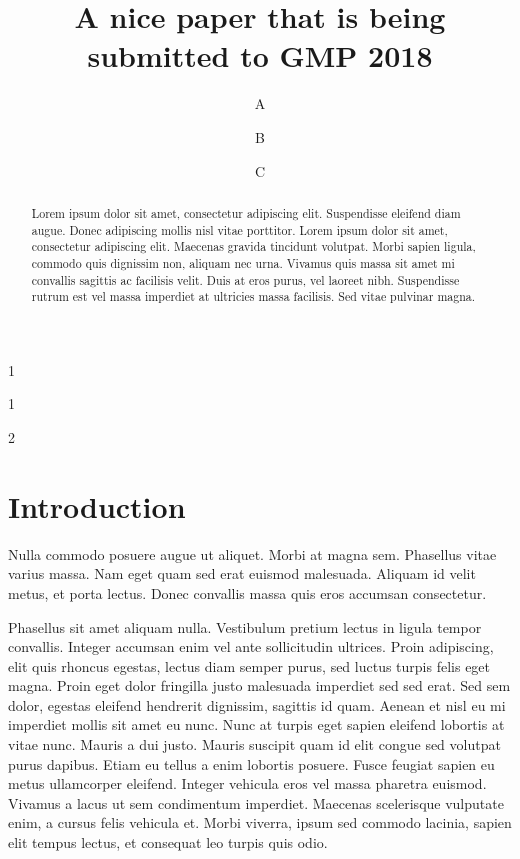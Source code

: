 \documentclass[submission]{gmp2018}
\begin{document}
%
%
\title{A nice paper that is being submitted to GMP 2018}

%
%

%
%
\author{A}{1}
\author{B}{1}
\author{C}{2}

%
%

%
%


\maketitle

\begin{abstract}
Lorem ipsum dolor sit amet, consectetur adipiscing elit. Suspendisse eleifend diam augue. Donec adipiscing mollis nisl vitae porttitor. Lorem ipsum dolor sit amet, consectetur adipiscing elit. Maecenas gravida tincidunt volutpat. Morbi sapien ligula, commodo quis dignissim non, aliquam nec urna. Vivamus quis massa sit amet mi convallis sagittis ac facilisis velit. Duis at eros purus, vel laoreet nibh. Suspendisse rutrum est vel massa imperdiet at ultricies massa facilisis. Sed vitae pulvinar magna.
\end{abstract}


\section{Introduction}

Nulla commodo posuere augue ut aliquet. Morbi at magna sem. Phasellus vitae varius massa. Nam eget quam sed erat euismod malesuada. Aliquam id velit metus, et porta lectus. Donec convallis massa quis eros accumsan consectetur.

Phasellus sit amet aliquam nulla. Vestibulum pretium lectus in ligula tempor convallis. Integer accumsan enim vel ante sollicitudin ultrices. Proin adipiscing, elit quis rhoncus egestas, lectus diam semper purus, sed luctus turpis felis eget magna. Proin eget dolor fringilla justo malesuada imperdiet sed sed erat. Sed sem dolor, egestas eleifend hendrerit dignissim, sagittis id quam. Aenean et nisl eu mi imperdiet mollis sit amet eu nunc. Nunc at turpis eget sapien eleifend lobortis at vitae nunc. Mauris a dui justo. Mauris suscipit quam id elit congue sed volutpat purus dapibus. Etiam eu tellus a enim lobortis posuere. Fusce feugiat sapien eu metus ullamcorper eleifend. Integer vehicula eros vel massa pharetra euismod. Vivamus a lacus ut sem condimentum imperdiet. Maecenas scelerisque vulputate enim, a cursus felis vehicula et. Morbi viverra, ipsum sed commodo lacinia, sapien elit tempus lectus, et consequat leo turpis quis odio.
\end{document}

